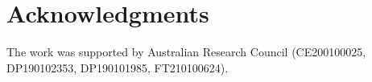 \documentclass[conference]{IEEEtran}
\begin{document}
\section{Acknowledgments}
The work was supported by Australian Research Council (CE200100025, DP190102353, DP190101985, FT210100624).



\end{document}
